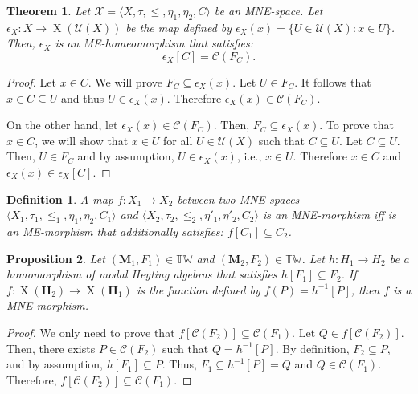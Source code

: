 \documentclass[pdflatex,sn-mathphys-num]{sn-jnl}%
\newcommand{\A}{\mathbf{A}}
\newcommand{\He}{\mathbf{H}}
\newcommand{\X}[1]{\operatorname{X}(#1)}
\theoremstyle{thmstyleone}%
\newtheorem{theorem}{Theorem}%
\newtheorem{proposition}[theorem]{Proposition}%
\theoremstyle{thmstyletwo}%
\theoremstyle{thmstylethree}%
\newtheorem{definition}{Definition}%
\begin{document}

\begin{theorem}
    Let $\mathcal{X} = \langle X, \tau, \leq,\eta_1, \eta_2, C\rangle$ be an MNE-space. Let $\epsilon_X\colon X\to \X{\mathcal{U}(X)}$ be the map defined by $\epsilon_X(x)=\{U\in\mathcal{U}(X):x\in U\}$. Then, $\epsilon_X$ is an ME-homeomorphism that satisfies:
    \[\epsilon_X[C]=\mathcal{C}(F_C).\]
\end{theorem}
\begin{proof}
    Let $x\in C$. We will prove $F_C\subseteq \epsilon_X(x)$. Let $U\in F_C$. It follows that $x\in C\subseteq U$ and thus $U\in \epsilon_X(x)$. Therefore $\epsilon_X(x)\in \mathcal{C}(F_C)$.

    On the other hand, let $\epsilon_X(x)\in \mathcal{C}(F_C)$. Then, $F_C\subseteq \epsilon_X(x)$. To prove that $x\in C$, we will show that $x\in U$ for all $U\in\mathcal{U}(X)$ such that $C\subseteq U$. Let $C\subseteq U$. Then, $U\in F_C$ and by assumption, $U\in \epsilon_X(x)$, i.e., $x\in U$. Therefore $x\in C$ and $\epsilon_X(x)\in \epsilon_X[C]$.
\end{proof}

\begin{definition}
A map $f \colon X_1\to X_2$	 between two MNE-spaces $\langle X_1,\tau_1,\leq_1,\eta_1,\eta_2,C_1\rangle$ and $\langle X_2,\tau_2,\leq_2,\eta'_1,\eta'_2,C_2\rangle$ is an MNE-morphism iff is an ME-morphism that additionally satisﬁes: $f[C_1]\subseteq C_2$.

\end{definition}

\begin{proposition}
    Let $(\mathbf{M}_1,F_1)\in\mathbb{TW}$ and  $(\mathbf{M}_2,F_2)\in\mathbb{TW}$. Let $h\colon H_1\to H_2$ be a homomorphism of modal Heyting algebras that satisfies $h[F_1]\subseteq F_2$. If $f\colon \X{\He_2}\to\X{\He_1}$ is the function defined by $f(P)=h^{-1}[P]$, then $f$ is a MNE-morphism.
\end{proposition}
\begin{proof}
    We only need to prove that $f[\mathcal{C}(F_2)]\subseteq \mathcal{C}(F_1)$. Let $Q\in f[\mathcal{C}(F_2)]$. Then, there exists $P\in \mathcal{C}(F_2)$ such that $Q=h^{-1}[P]$. By definition, $F_2\subseteq P$, and by assumption, $h[F_1]\subseteq P$. Thus, $F_1\subseteq h^{-1}[P]=Q$ and $Q\in \mathcal{C}(F_1)$. Therefore, $f[\mathcal{C}(F_2)]\subseteq\mathcal{C}(F_1)$.
\end{proof}
\end{document}

